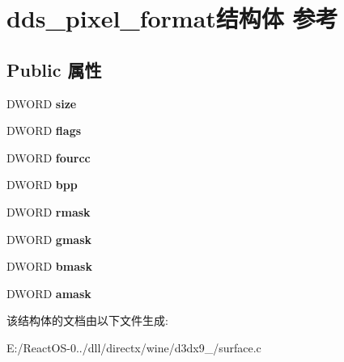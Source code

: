 \hypertarget{structdds__pixel__format}{}\section{dds\+\_\+pixel\+\_\+format结构体 参考}
\label{structdds__pixel__format}
\subsection*{Public 属性}
\begin{DoxyCompactItemize}
\item 
\mbox{\label{structdds__pixel__format_af9230f978967da9df724a580237105c3}} 
D\+W\+O\+RD {\bfseries size}
\item 
\mbox{\label{structdds__pixel__format_a5d6eaddf9ea8ee251f0ac3decc7ee471}} 
D\+W\+O\+RD {\bfseries flags}
\item 
\mbox{\label{structdds__pixel__format_aa3316856d6a1397799fdcd975620e66a}} 
D\+W\+O\+RD {\bfseries fourcc}
\item 
\mbox{\label{structdds__pixel__format_a552015a89757f7292d9a2aeaf4bb212a}} 
D\+W\+O\+RD {\bfseries bpp}
\item 
\mbox{\label{structdds__pixel__format_a6950c3e3d942d006c7181f541b4225eb}} 
D\+W\+O\+RD {\bfseries rmask}
\item 
\mbox{\label{structdds__pixel__format_af413613c404f87006491cdac1d0965d2}} 
D\+W\+O\+RD {\bfseries gmask}
\item 
\mbox{\label{structdds__pixel__format_aba5b7dd3035fb08f818fb709e0c17259}} 
D\+W\+O\+RD {\bfseries bmask}
\item 
\mbox{\label{structdds__pixel__format_a718f19740d03f6ad4667418d5d12038d}} 
D\+W\+O\+RD {\bfseries amask}
\end{DoxyCompactItemize}


该结构体的文档由以下文件生成\+:\begin{DoxyCompactItemize}
\item 
E\+:/\+React\+O\+S-\/0../dll/directx/wine/d3dx9\+\_/surface.\+c\end{DoxyCompactItemize}
